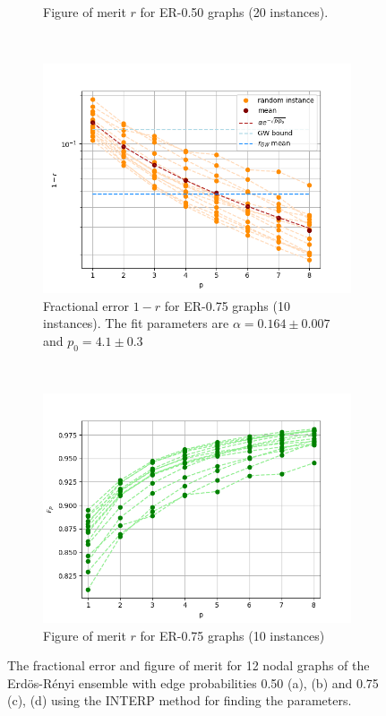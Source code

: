 \begin{figure}[H]
\begin{subfigure}[t]{0.48\textwidth}
		\caption{Figure of merit $r$ for ER-0.50 graphs (20 instances).}
	\end{subfigure}%
	\\
	\begin{subfigure}[t]{0.48\textwidth}
		\centering
		\includegraphics[width=\textwidth]{figures/interp/fom_er075.png}
		\caption{Fractional error $1-r$ for ER-0.75 graphs (10 instances). The fit parameters are $\alpha = 0.164 \pm 0.007$ and $p_0 = 4.1 \pm 0.3$}
	\end{subfigure}
	~
	\begin{subfigure}[t]{0.48\textwidth}
		\centering
		\includegraphics[width=\textwidth]{figures/interp/r_er075.png}
		\caption{Figure of merit $r$ for ER-0.75 graphs (10 instances)}
	\end{subfigure}%
	\caption{The fractional error and figure of merit for 12 nodal graphs of the Erd\"os-R\'enyi ensemble with edge probabilities 0.50 (a), (b) and 0.75 (c), (d) using the INTERP method for finding the parameters.}
	\label{fig:fom-ER}
\end{figure}


